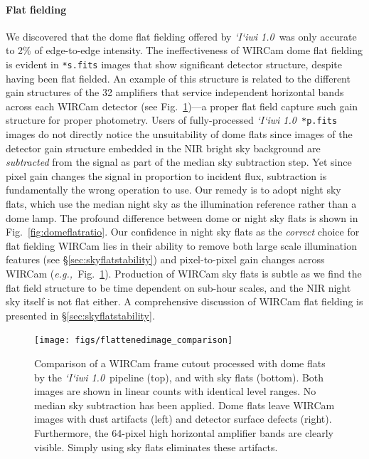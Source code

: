 \documentclass[iop]{emulateapj}
\newcommand{\eg}{\textit{e.g.,~}}
\newcommand{\sw}[1]{\textit{#1}} %
\newcommand{\iiwione}{\sw{`I`iwi 1.0}}
\newcommand{\Fig}[1]{Fig.~\ref{fig:#1}}  %
\newcommand{\Sec}[1]{\S\ref{sec:#1}}  %
\begin{document}
\paragraph{Flat fielding} We discovered that the dome flat fielding offered by \iiwione\ was only accurate to 2\% of edge-to-edge intensity.
The ineffectiveness of WIRCam dome flat fielding is evident in \texttt{*s.fits} images that show significant detector structure, despite having been flat fielded.
An example of this structure is related to the different gain structures of the 32 amplifiers that service independent horizontal bands across each WIRCam detector (see \Fig{flattenedimage_comparison})---a proper flat field capture such gain structure for proper photometry.
Users of fully-processed \iiwione\ \texttt{*p.fits} images do not directly notice the unsuitability of dome flats since images of the detector gain structure embedded in the NIR bright sky background are \textit{subtracted} from the signal as part of the median sky subtraction step.
Yet since pixel gain changes the signal in proportion to incident flux, subtraction is fundamentally the wrong operation to use.
Our remedy is to adopt night sky flats, which use the median night sky as the illumination reference rather than a dome lamp.
The profound difference between dome or night sky flats is shown in \Fig{domeflatratio}.
Our confidence in night sky flats as the \textit{correct} choice for flat fielding WIRCam lies in their ability to remove both large scale illumination features (see \Sec{skyflatstability}) and pixel-to-pixel gain changes across WIRCam (\eg \Fig{flattenedimage_comparison}).
Production of WIRCam sky flats is subtle as we find the flat field structure to be time dependent on sub-hour scales, and the NIR night sky itself is not flat either.
A comprehensive discussion of WIRCam flat fielding is presented in \Sec{skyflatstability}.

\begin{figure}[t]
\centering
\texttt{[image: figs/flattenedimage\_comparison]}
\caption{Comparison of a WIRCam frame cutout processed with dome flats by the \iiwione\ pipeline (top), and with sky flats (bottom).
Both images are shown in linear counts with identical level ranges.
No median sky subtraction has been applied.
Dome flats leave WIRCam images with dust artifacts (left) and detector surface defects (right). Furthermore, the 64-pixel high horizontal amplifier bands are clearly visible.
Simply using sky flats eliminates these artifacts.
}
\label{fig:flattenedimage_comparison}
\end{figure}
\end{document}
